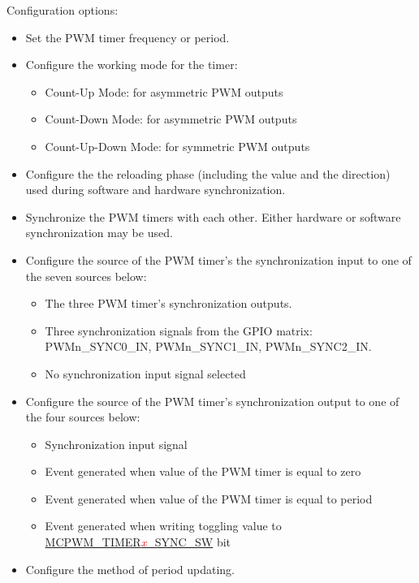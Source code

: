 \documentclass[main\_\_EN.tex]{subfiles}
\begin{document}
Configuration options:
\begin{itemize}
    \item Set the PWM timer frequency or period.
    \item Configure the working mode for the timer:
        \begin{itemize}
            \item Count-Up Mode: for asymmetric PWM outputs
            \item Count-Down Mode: for asymmetric PWM outputs
            \item Count-Up-Down Mode: for symmetric PWM outputs
        \end{itemize}
    \item Configure the the reloading phase (including the value and the direction) used during software and hardware synchronization.
    \item Synchronize the PWM timers with each other. Either hardware or software synchronization may be used.
    \item Configure the source of the PWM timer's the synchronization input to one of the seven sources below:
        \begin{itemize}
            \item The three PWM timer's synchronization outputs.
            \item Three synchronization signals from the GPIO matrix: PWMn\_SYNC0\_IN, PWMn\_SYNC1\_IN, PWMn\_SYNC2\_IN.
            \item No synchronization input signal selected
        \end{itemize}
    \item Configure the source of the PWM timer's synchronization output to one of the four sources below:
        \begin{itemize}
            \item Synchronization input signal
            \item Event generated when value of the PWM timer is equal to zero
            \item Event generated when value of the PWM timer is equal to period
            \item Event generated when writing toggling value to \hyperref[fielddesc:MCPWMTIMER0SYNCSW]{MCPWM\_TIMER\textcolor{red}{\it{x}}\_SYNC\_SW} bit
        \end{itemize}
    \item Configure the method of period updating.
\end{itemize}
\end{document}
